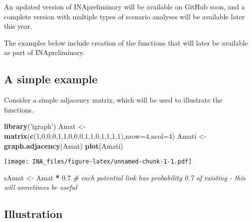 \documentclass[]{article}
\newenvironment{Shaded}{\begin{snugshade}}{\end{snugshade}}
\newcommand{\KeywordTok}[1]{\textcolor[rgb]{0.13,0.29,0.53}{\textbf{#1}}}
\newcommand{\DataTypeTok}[1]{\textcolor[rgb]{0.13,0.29,0.53}{#1}}
\newcommand{\DecValTok}[1]{\textcolor[rgb]{0.00,0.00,0.81}{#1}}
\newcommand{\FloatTok}[1]{\textcolor[rgb]{0.00,0.00,0.81}{#1}}
\newcommand{\StringTok}[1]{\textcolor[rgb]{0.31,0.60,0.02}{#1}}
\newcommand{\CommentTok}[1]{\textcolor[rgb]{0.56,0.35,0.01}{\textit{#1}}}
\newcommand{\OperatorTok}[1]{\textcolor[rgb]{0.81,0.36,0.00}{\textbf{#1}}}
\newcommand{\NormalTok}[1]{#1}
\begin{document}
An updated version of INApreliminary will be available on GitHub soon,
and a complete version with multiple types of scenario analyses will be
available later this year.

The examples below include creation of the functions that will later be
available as part of INApreliminary.

\subsection{A simple example}\label{a-simple-example}

Consider a simple adjacency matrix, which will be used to illustrate the
functions.

\begin{Shaded}
\begin{Highlighting}[]
\KeywordTok{library}\NormalTok{(}\StringTok{'igraph'}\NormalTok{)}
\NormalTok{Amat <-}\StringTok{ }\KeywordTok{matrix}\NormalTok{(}\KeywordTok{c}\NormalTok{(}\DecValTok{1}\NormalTok{,}\DecValTok{0}\NormalTok{,}\DecValTok{0}\NormalTok{,}\DecValTok{0}\NormalTok{,}\DecValTok{1}\NormalTok{,}\DecValTok{1}\NormalTok{,}\DecValTok{0}\NormalTok{,}\DecValTok{0}\NormalTok{,}\DecValTok{0}\NormalTok{,}\DecValTok{1}\NormalTok{,}\DecValTok{1}\NormalTok{,}\DecValTok{0}\NormalTok{,}\DecValTok{1}\NormalTok{,}\DecValTok{1}\NormalTok{,}\DecValTok{1}\NormalTok{,}\DecValTok{1}\NormalTok{),}\DataTypeTok{nrow=}\DecValTok{4}\NormalTok{,}\DataTypeTok{ncol=}\DecValTok{4}\NormalTok{)}
\NormalTok{Amati <-}\StringTok{ }\KeywordTok{graph.adjacency}\NormalTok{(Amat)}
\KeywordTok{plot}\NormalTok{(Amati)}
\end{Highlighting}
\end{Shaded}

\texttt{[image: INA\_files/figure-latex/unnamed-chunk-1-1.pdf]}

\begin{Shaded}
\begin{Highlighting}[]
\NormalTok{sAmat <-}\StringTok{ }\NormalTok{Amat }\OperatorTok{*}\StringTok{ }\FloatTok{0.7} \CommentTok{# each potential link has probability 0.7 of existing - this will sometimes be useful}
\end{Highlighting}
\end{Shaded}

\subsection{Illustration}\label{illustration}
\end{document}
